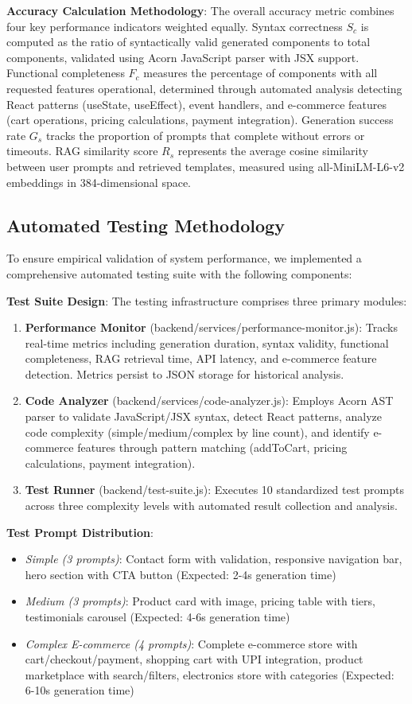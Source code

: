 \documentclass[10pt, conference, letterpaper]{IEEEtran}
\begin{document}
\textbf{Accuracy Calculation Methodology}: The overall accuracy metric combines four key performance indicators weighted equally. Syntax correctness $S_c$ is computed as the ratio of syntactically valid generated components to total components, validated using Acorn JavaScript parser with JSX support. Functional completeness $F_c$ measures the percentage of components with all requested features operational, determined through automated analysis detecting React patterns (useState, useEffect), event handlers, and e-commerce features (cart operations, pricing calculations, payment integration). Generation success rate $G_s$ tracks the proportion of prompts that complete without errors or timeouts. RAG similarity score $R_s$ represents the average cosine similarity between user prompts and retrieved templates, measured using all-MiniLM-L6-v2 embeddings in 384-dimensional space.

\subsection{Automated Testing Methodology}
To ensure empirical validation of system performance, we implemented a comprehensive automated testing suite with the following components:

\textbf{Test Suite Design}: The testing infrastructure comprises three primary modules:
\begin{enumerate}
    \item \textbf{Performance Monitor} (backend/services/performance-monitor.js): Tracks real-time metrics including generation duration, syntax validity, functional completeness, RAG retrieval time, API latency, and e-commerce feature detection. Metrics persist to JSON storage for historical analysis.
    \item \textbf{Code Analyzer} (backend/services/code-analyzer.js): Employs Acorn AST parser to validate JavaScript/JSX syntax, detect React patterns, analyze code complexity (simple/medium/complex by line count), and identify e-commerce features through pattern matching (addToCart, pricing calculations, payment integration).
    \item \textbf{Test Runner} (backend/test-suite.js): Executes 10 standardized test prompts across three complexity levels with automated result collection and analysis.
\end{enumerate}

\textbf{Test Prompt Distribution}:
\begin{itemize}
    \item \textit{Simple (3 prompts)}: Contact form with validation, responsive navigation bar, hero section with CTA button (Expected: 2-4s generation time)
    \item \textit{Medium (3 prompts)}: Product card with image, pricing table with tiers, testimonials carousel (Expected: 4-6s generation time)
    \item \textit{Complex E-commerce (4 prompts)}: Complete e-commerce store with cart/checkout/payment, shopping cart with UPI integration, product marketplace with search/filters, electronics store with categories (Expected: 6-10s generation time)
\end{itemize}
\end{document}
